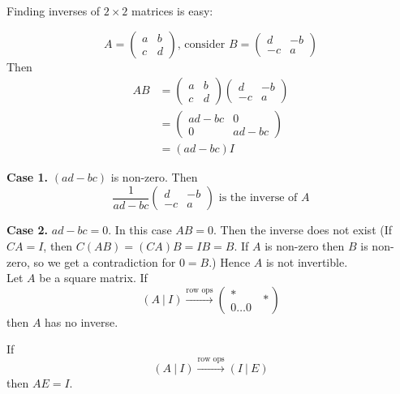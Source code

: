 \documentclass[10pt]{scrartcl}
\begin{document}
Finding inverses of $2 \times 2$ matrices is easy: 

\[A = \begin{pmatrix}
 a & b \\ c & d	
 \end{pmatrix} \text{, consider }
B= \begin{pmatrix}
 d & -b \\ -c & a	
 \end{pmatrix}
\]
Then \[\begin{aligned}
AB &= \begin{pmatrix}
 a & b \\ c & d	
 \end{pmatrix} \begin{pmatrix}
 d & -b \\ -c & a	
 \end{pmatrix}\\[0.2cm]
 &= \begin{pmatrix}
 ad -bc & 0\\ 0 & ad-bc	
 \end{pmatrix}\\[0.2cm]
 &= (ad -bc)I
\end{aligned}\]


\textbf{Case 1.} $(ad -bc)$ is non-zero. Then\[
\frac{1}{ad-bc}\begin{pmatrix}
d & -b \\ -c & a	
\end{pmatrix}
\text{ is the inverse of } A
\]	

\textbf{Case 2.} $ad -bc = 0$. In this case $AB = 0$. Then the inverse does not exist (If $CA = I$, then $C(AB) = (CA)B = IB = B.$ If $A$ is non-zero then $B$ is non-zero, so we get a contradiction for $0 = B$.) Hence $A$ is not invertible. \\

Let $A$ be a square matrix. 
If   
\[
  (A ~|~ I) \overset{\text{row ops}}{\longrightarrow} 
  \left(
    \begin{array}{c|}
   *\\ 0 \dots 0
  \end{array} ~~* \right)   
\]
then $A$ has no inverse. 


If   
\[
  (A ~|~ I) \overset{\text{row ops}}{\longrightarrow} 
 (I ~|~ E)
\]
then $AE = I$. 
\end{document}
